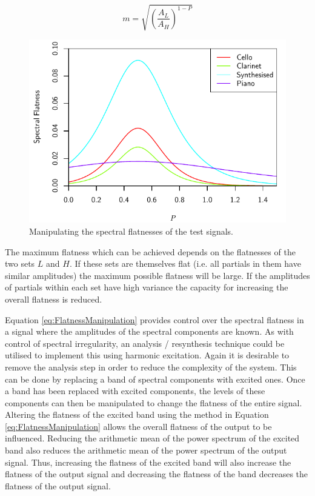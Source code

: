		\begin{equation}
			m = \sqrt{ \left( \frac{A_L}{A_H} \right) ^{1 - P}}
			\label{eq:FlatnessControlParameter}
		\end{equation}

		\begin{figure}[h!]
			\centering
			\includegraphics{chapter6/Images/MoveFlatnesses.pdf}
			\caption{Manipulating the spectral flatnesses of the test signals.}
			\label{fig:MoveFlatnesses}
		\end{figure}

		The maximum flatness which can be achieved depends on the flatnesses of the two sets $L$ and $H$.  If these
		sets are themselves flat (i.e. all partials in them have similar amplitudes) the maximum possible flatness
		will be large. If the amplitudes of partials within each set have high variance the capacity for increasing
		the overall flatness is reduced.

		Equation \ref{eq:FlatnessManipulation} provides control over the spectral flatness in a signal where the
		amplitudes of the spectral components are known. As with control of spectral irregularity, an analysis /
		resynthesis technique could be utilised to implement this using harmonic excitation.  Again it is desirable
		to remove the analysis step in order to reduce the complexity of the system.  This can be done by replacing
		a band of spectral components with excited ones. Once a band has been replaced with excited components, the
		levels of these components can then be manipulated to change the flatness of the entire signal. Altering
		the flatness of the excited band using the method in Equation \ref{eq:FlatnessManipulation} allows the
		overall flatness of the output to be influenced. Reducing the arithmetic mean of the power spectrum of the
		excited band also reduces the arithmetic mean of the power spectrum of the output signal. Thus, increasing
		the flatness of the excited band will also increase the flatness of the output signal and decreasing the
		flatness of the band decreases the flatness of the output signal.

